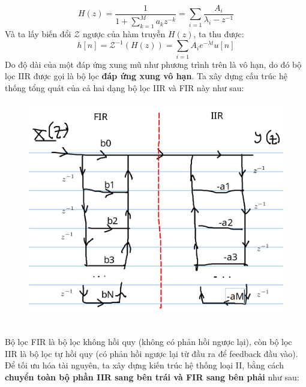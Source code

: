 \documentclass{article}
\begin{document}
$$H(z)=\frac{1}{1+\sum_{k=1}^{M}a_{k}z^{-k}}=\sum_{i=1}\frac{A_{i}}{\lambda_{i}-z^{-1}}$$
Và ta lấy biến đổi $\mathscr{Z}$ ngược của hàm truyền $H(z)$, ta thu được:
$$h[n]=\mathscr{Z}^{-1}(H(z))=\sum_{i=1}A_{i}e^{-\lambda t}u[n]$$
Do độ dài của một đáp ứng xung mũ như phương trình trên là vô hạn, do đó bộ lọc IIR được gọi là bộ lọc \textbf{đáp ứng xung vô hạn}.
Ta xây dựng cấu trúc hệ thống tổng quát của cả hai dạng bộ lọc IIR và FIR này như sau:
\begin{figure}[H]
  \begin{center}
  \includegraphics[width=16cm]{system.png}
  \end{center}
  \end{figure} 
\\Bộ lọc FIR là bộ lọc không hồi quy (không có phản hồi ngược lại), còn bộ lọc IIR là bộ lọc tự hồi quy (có phản hồi ngược lại từ đầu ra để feedback đầu vào).
Để tối ưu hóa tài nguyên, ta xây dựng kiến trúc hệ thống loại II, bằng cách \textbf{chuyển toàn bộ phần IIR sang bên trái và FIR sang bên phải} như sau:
\end{document}
